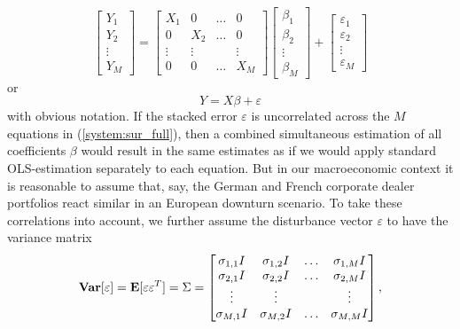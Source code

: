 \documentclass[a4paper, 11pt]{scrreprt}
\newcommand{\ew}{\mbox{\textbf{E}}}
\newcommand{\var}{\mbox{\textbf{Var}}}
\begin{document}
\begin{equation}\label{system:sur_full}
\begin{bmatrix}
Y_1 \\ Y_2 \\ \vdots \\ Y_M
\end{bmatrix}
=
\begin{bmatrix}
X_1    & 0      & \dots  & 0 \\
0      & X_2    & \dots  & 0 \\
\vdots & \vdots &        & \vdots \\
0      & 0      & \dots  & X_M 
\end{bmatrix}
\begin{bmatrix}
\beta_1 \\ \beta_2 \\ \vdots \\ \beta_M
\end{bmatrix}
+
\begin{bmatrix}
\varepsilon_1 \\ \varepsilon_2 \\ \vdots \\ \varepsilon_M
\end{bmatrix}
\end{equation}
or
\begin{equation}\label{system:sur_short}
Y = X \beta + \varepsilon
\end{equation}
with obvious notation. If the stacked error $\varepsilon$ is uncorrelated across the $M$ equations in (\ref{system:sur_full}), then a combined simultaneous estimation of all coefficients $\beta$ would result in the same estimates as if we would apply standard OLS-estimation separately to each equation. But in our macroeconomic context it is reasonable to assume that, say, the German and French corporate dealer portfolios react similar in an European downturn scenario. To take these correlations into account, we further assume the disturbance vector $\varepsilon$ to have the variance matrix
\begin{equation}
\var[\varepsilon] = \ew[\varepsilon \varepsilon^T] = \Sigma = \begin{bmatrix}
\sigma_{1,1}I & \sigma_{1,2}I & \dots & \sigma_{1,M}I \\
\sigma_{2,1}I & \sigma_{2,2}I & \dots & \sigma_{2,M}I \\
\vdots & \vdots & & \vdots \\
\sigma_{M,1}I & \sigma_{M,2}I & \dots & \sigma_{M,M}I 
\end{bmatrix},
\end{equation}
\end{document}
